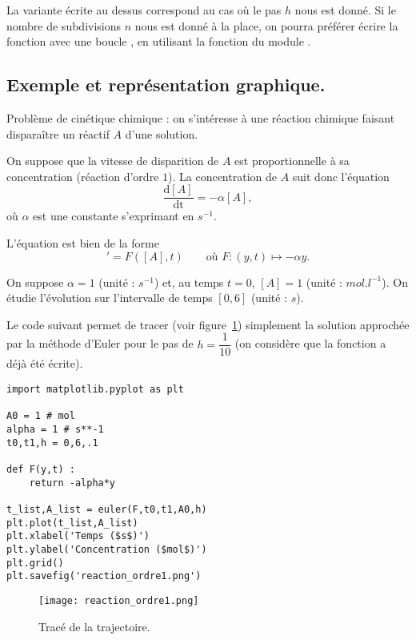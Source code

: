 \begin{rem}
  La variante écrite au dessus correspond au cas où le pas $h$ nous est donné. 
  Si le nombre de subdivisions $n$ nous est donné à la place, on pourra préférer écrire la fonction avec une boucle , en utilisant la fonction  du module .
\end{rem}

\subsection{Exemple et représentation graphique.}

Problème de cinétique chimique : on s'intéresse à une réaction chimique
faisant disparaître un réactif $A$ d'une solution.

On suppose que la vitesse de disparition de $A$ est proportionnelle
à sa concentration (réaction d'ordre $1$). La concentration de $A$ suit donc l'équation
\begin{equation*}
  \dfrac{\textrm{d}[A]}{\textrm{dt}} = -\alpha [A],
\end{equation*}
où $\alpha$ est une constante s'exprimant en $s^{-1}$.%

L'équation est bien de la forme
\begin{equation*}
  [A]' = F([A],t) \qquad \text{où }F : (y,t)\mapsto -\alpha y.
\end{equation*}

On suppose $\alpha=1$ (unité : $s^{-1}$) et, au temps $t=0$, $[A] =
1$ (unité : $mol.l^{-1}$). 
On étudie l'évolution sur l'intervalle de temps $[0,6]$ (unité : $s$).


Le code suivant permet de tracer (voir figure~\ref{11:fig:reaction_ordre1}) simplement la solution approchée par la méthode d'Euler pour le pas de $h=\dfrac{1}{10}$ (on considère que la fonction  a déjà été écrite). 

\begin{lstlisting}
import matplotlib.pyplot as plt

A0 = 1 # mol
alpha = 1 # s**-1
t0,t1,h = 0,6,.1

def F(y,t) :
    return -alpha*y

t_list,A_list = euler(F,t0,t1,A0,h)
plt.plot(t_list,A_list)
plt.xlabel('Temps ($s$)')
plt.ylabel('Concentration ($mol$)')
plt.grid()
plt.savefig('reaction_ordre1.png')
\end{lstlisting}
\begin{figure}[!h]
    \begin{center}
        \texttt{[image: reaction\_ordre1.png]}
        \caption{Tracé de la trajectoire.}
        \label{11:fig:reaction_ordre1}
    \end{center}
\end{figure}

